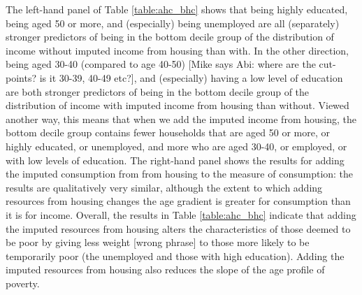 The left-hand panel of Table \ref{table:ahc_bhc} shows that being highly educated, being aged 50 or more, and (especially) being unemployed are all (separately) stronger predictors of being in the bottom decile group of the distribution of income without imputed income from housing than with. In the other direction, being aged 30-40 (compared to age 40-50) [Mike says Abi: where are the cut-points? is it 30-39, 40-49 etc?], and (especially) having a low level of education are both stronger predictors of being in the bottom decile group of the distribution of income with imputed income from housing than without. Viewed another way, this means that when we add the imputed income from housing, the bottom decile group contains fewer households that are aged 50 or more, or highly educated, or unemployed, and more who are aged 30-40, or employed, or with low levels of education. The right-hand panel shows the results for adding the imputed consumption from from housing to the measure of consumption: the results are qualitatively very similar, although the extent to which adding resources from housing changes the age gradient is greater for consumption than it is for income. Overall, the results in Table \ref{table:ahc_bhc} indicate that adding the imputed resources from housing alters the characteristics of those deemed to be poor by giving less weight [wrong phrase] to those more likely to be temporarily poor (the unemployed and those with high education). Adding the imputed resources from housing also reduces the slope of the age profile of poverty.





